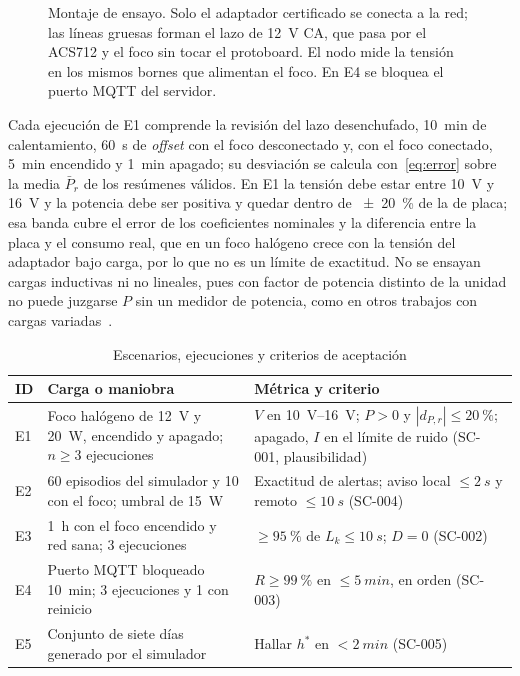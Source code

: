 \begin{figure}[t]
  \centering
  
  \caption{Montaje de ensayo. Solo el adaptador certificado se conecta a la red; las líneas gruesas forman el lazo de \SI{12}{V} CA, que pasa por el ACS712 y el foco sin tocar el protoboard. El nodo mide la tensión en los mismos bornes que alimentan el foco. En E4 se bloquea el puerto MQTT del servidor.}
  \label{fig:testsetup}
\end{figure}

Cada ejecución de E1 comprende la revisión del lazo desenchufado, \SI{10}{min} de calentamiento, \SI{60}{s} de \textit{offset} con el foco desconectado y, con el foco conectado, \SI{5}{min} encendido y \SI{1}{min} apagado; su desviación se calcula con~\eqref{eq:error} sobre la media $\bar{P}_r$ de los resúmenes válidos.
En E1 la tensión debe estar entre \SI{10}{V} y \SI{16}{V} y la potencia debe ser positiva y quedar dentro de \SI{\pm 20}{\percent} de la de placa; esa banda cubre el error de los coeficientes nominales y la diferencia entre la placa y el consumo real, que en un foco halógeno crece con la tensión del adaptador bajo carga, por lo que no es un límite de exactitud.
No se ensayan cargas inductivas ni no lineales, pues con factor de potencia distinto de la unidad no puede juzgarse $P$ sin un medidor de potencia, como en otros trabajos con cargas variadas~\cite{cardenas2026residential}.

\begin{table}[t]
\centering
\caption{Escenarios, ejecuciones y criterios de aceptación}
\label{tab:scenarios}
\footnotesize
\begin{tabular}{@{}l >{\raggedright}p{3.3cm} >{\raggedright\arraybackslash}p{3.55cm}@{}}
\toprule
ID & Carga o maniobra & Métrica y criterio \\
\midrule
E1 & Foco halógeno de \SI{12}{V} y \SI{20}{W}, encendido y apagado; $n\geq3$ ejecuciones & $V$ en \SIrange{10}{16}{V}; $P>0$ y $|d_{P,r}|\leq\SI{20}{\percent}$; apagado, $I$ en el límite de ruido (SC-001, plausibilidad) \\
E2 & 60 episodios del simulador y 10 con el foco; umbral de \SI{15}{W} & Exactitud de alertas; aviso local $\leq\SI{2}{s}$ y remoto $\leq\SI{10}{s}$ (SC-004) \\
E3 & \SI{1}{h} con el foco encendido y red sana; 3 ejecuciones & $\geq\SI{95}{\percent}$ de $L_k\leq\SI{10}{s}$; $D=0$ (SC-002) \\
E4 & Puerto MQTT bloqueado \SI{10}{min}; 3 ejecuciones y 1 con reinicio & $R\geq\SI{99}{\percent}$ en $\leq\SI{5}{min}$, en orden (SC-003) \\
E5 & Conjunto de siete días generado por el simulador & Hallar $h^{*}$ en $<\SI{2}{min}$ (SC-005) \\
\bottomrule
\end{tabular}
\end{table}

